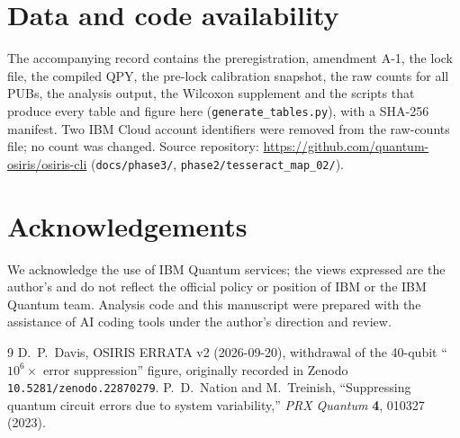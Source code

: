 \documentclass[10pt,twocolumn]{article}
\begin{document}
\section*{Data and code availability}
The accompanying record contains the preregistration, amendment A-1, the lock file, the compiled QPY,
the pre-lock calibration snapshot, the raw counts for all \NPubs{} PUBs, the analysis output, the
Wilcoxon supplement and the scripts that produce every table and figure here
(\texttt{generate\_tables.py}), with a SHA-256 manifest. Two IBM Cloud account identifiers were removed
from the raw-counts file; no count was changed. Source repository:
\url{https://github.com/quantum-osiris/osiris-cli} (\texttt{docs/phase3/}, \texttt{phase2/tesseract\_map\_02/}).

\section*{Acknowledgements}
We acknowledge the use of IBM Quantum services; the views expressed are the author's and do not
reflect the official policy or position of IBM or the IBM Quantum team. Analysis code and this
manuscript were prepared with the assistance of AI coding tools under the author's direction and
review.

\begin{thebibliography}{9}\small
{} D.~P.~Davis, OSIRIS ERRATA v2 (2026-09-20), withdrawal of the 40-qubit
``$10^6\times$ error suppression'' figure, originally recorded in Zenodo \texttt{10.5281/zenodo.22870279}.
 P.~D.~Nation and M.~Treinish, ``Suppressing quantum circuit errors due to system
variability,'' \emph{PRX Quantum} \textbf{4}, 010327 (2023).
\end{thebibliography}
\end{document}
